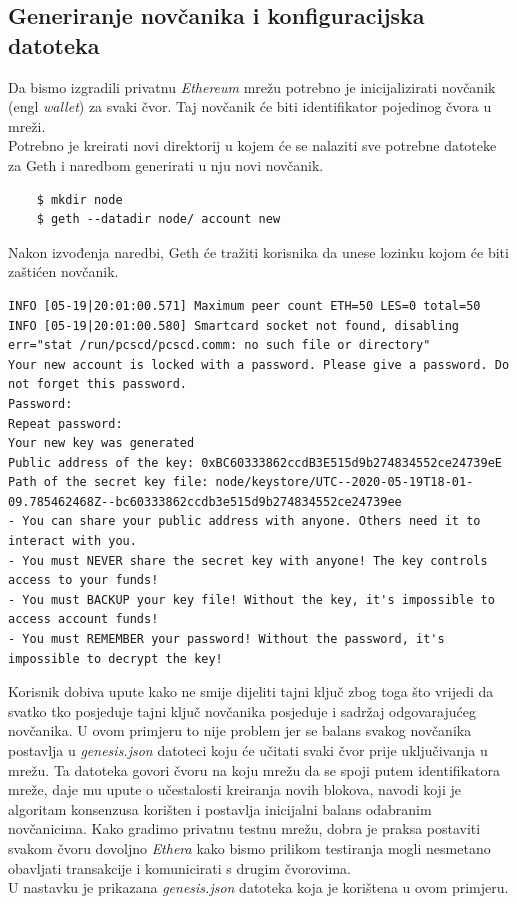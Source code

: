 \documentclass[times, utf8, zavrsni, numeric]{fer}
\begin{document}
\subsection{Generiranje novčanika i konfiguracijska datoteka}
Da bismo izgradili privatnu \emph{Ethereum} mrežu potrebno je inicijalizirati novčanik (engl \emph{wallet}) za svaki čvor. Taj novčanik
će biti identifikator pojedinog čvora u mreži. \\
Potrebno je kreirati novi direktorij u kojem će se nalaziti sve potrebne datoteke za Geth i naredbom generirati u nju novi novčanik.

\begin{lstlisting}
    $ mkdir node
    $ geth --datadir node/ account new
\end{lstlisting}

Nakon izvođenja naredbi, Geth će tražiti korisnika da unese lozinku kojom će biti zaštićen novčanik.

\begin{lstlisting}
INFO [05-19|20:01:00.571] Maximum peer count ETH=50 LES=0 total=50
INFO [05-19|20:01:00.580] Smartcard socket not found, disabling err="stat /run/pcscd/pcscd.comm: no such file or directory"
Your new account is locked with a password. Please give a password. Do not forget this password.
Password: 
Repeat password: 
Your new key was generated
Public address of the key: 0xBC60333862ccdB3E515d9b274834552ce24739eE
Path of the secret key file: node/keystore/UTC--2020-05-19T18-01-09.785462468Z--bc60333862ccdb3e515d9b274834552ce24739ee
- You can share your public address with anyone. Others need it to interact with you.
- You must NEVER share the secret key with anyone! The key controls access to your funds!
- You must BACKUP your key file! Without the key, it's impossible to access account funds!
- You must REMEMBER your password! Without the password, it's impossible to decrypt the key!
\end{lstlisting}

Korisnik dobiva upute kako ne smije dijeliti tajni ključ zbog toga što vrijedi da svatko tko posjeduje tajni ključ novčanika
posjeduje i sadržaj odgovarajućeg novčanika. U ovom primjeru to nije problem jer se balans svakog novčanika postavlja u \emph{genesis.json}
datoteci koju će učitati svaki čvor prije uključivanja u mrežu. Ta datoteka govori čvoru na koju mrežu da se spoji putem identifikatora
mreže, daje mu upute o učestalosti kreiranja novih blokova, navodi koji je algoritam konsenzusa korišten i postavlja inicijalni balans
odabranim novčanicima. Kako gradimo privatnu testnu mrežu, dobra je praksa postaviti svakom čvoru dovoljno \emph{Ethera} kako bismo
prilikom testiranja mogli nesmetano obavljati transakcije i komunicirati s drugim čvorovima. \\
U nastavku je prikazana \emph{genesis.json} datoteka koja je korištena u ovom primjeru.
\end{document}
